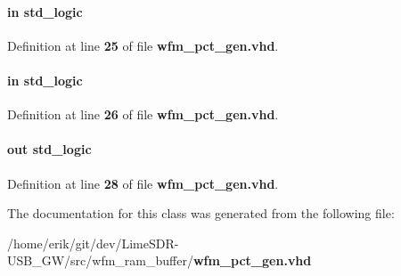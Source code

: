\paragraph[{wfm\+\_\+load}]{ {\bfseries \textcolor{keywordflow}{in}\textcolor{vhdlchar}{ }} {\bfseries \textcolor{comment}{std\+\_\+logic}\textcolor{vhdlchar}{ }} \hspace{0.3cm}{\ttfamily [Port]}}\label{classwfm__pct__gen_a3d169846da42e9b1a5f04bce97dd2fff}


Definition at line {\bf 25} of file {\bf wfm\+\_\+pct\+\_\+gen.\+vhd}.

\paragraph[{wfm\+\_\+play\+\_\+stop}]{ {\bfseries \textcolor{keywordflow}{in}\textcolor{vhdlchar}{ }} {\bfseries \textcolor{comment}{std\+\_\+logic}\textcolor{vhdlchar}{ }} \hspace{0.3cm}{\ttfamily [Port]}}\label{classwfm__pct__gen_aec820bcf21fff0d393f59c1e0478385c}


Definition at line {\bf 26} of file {\bf wfm\+\_\+pct\+\_\+gen.\+vhd}.

\paragraph[{wfm\+\_\+wr}]{ {\bfseries \textcolor{keywordflow}{out}\textcolor{vhdlchar}{ }} {\bfseries \textcolor{comment}{std\+\_\+logic}\textcolor{vhdlchar}{ }} \hspace{0.3cm}{\ttfamily [Port]}}\label{classwfm__pct__gen_a481be3558c58662628f766a8af6a2e13}


Definition at line {\bf 28} of file {\bf wfm\+\_\+pct\+\_\+gen.\+vhd}.



The documentation for this class was generated from the following file\+:\begin{DoxyCompactItemize}
\item 
/home/erik/git/dev/\+Lime\+S\+D\+R-\/\+U\+S\+B\+\_\+\+G\+W/src/wfm\+\_\+ram\+\_\+buffer/{\bf wfm\+\_\+pct\+\_\+gen.\+vhd}\end{DoxyCompactItemize}
